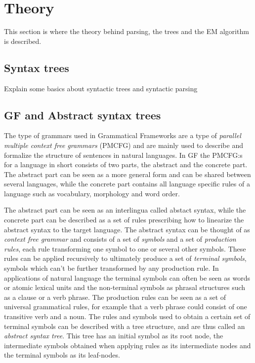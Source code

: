\chapter{Theory}

This section is where the theory behind parsing, the trees and the EM algorithm is described.
\section{Syntax trees}
Explain some basics about syntactic trees and syntactic parsing
\section{GF and Abstract syntax trees}

The type of grammars used in Grammatical Frameworks are a type of \emph{parallel multiple context free grammars} (PMCFG) and are mainly used to describe and formalize the structure of sentences in natural languages. In GF the PMCFG:s for a language in short consists of two parts, the abstract and the concrete part. The abstract part can be seen as a more general form and can be shared between several languages, while the concrete part contains all language specific rules of a language such as vocabulary, morphology and word order. 


The abstract part can be seen as an interlingua called abstact syntax, while the concrete part can be described as a set of rules prescribing how to linearize the abstract syntax to the target language. The abstract syntax can be thought of as \emph{context free grammar} and consists of a set of \emph{symbols} and a set of \emph{production rules}, each rule transforming one symbol to one or several other symbols. These rules can be applied recursively to ultimately produce a set of \emph{terminal symbols}, symbols which can't be further transformed by any production rule. In applications of natural language the terminal symbols can often be seen as words or atomic lexical units and the non-terminal symbols as phrasal structures such as a clause or a verb phrase. The production rules can be seen as a set of universal grammatical rules, for example that a verb phrase could consist of one transitive verb and a noun. The rules and symbols used to obtain a certain set of terminal symbols can be described with a tree structure, and are thus called an \emph{abstract syntax tree}. This tree has an initial symbol as its root node, the intermediate symbols obtained when applying rules as its intermediate nodes and the terminal symbols as its leaf-nodes. 


